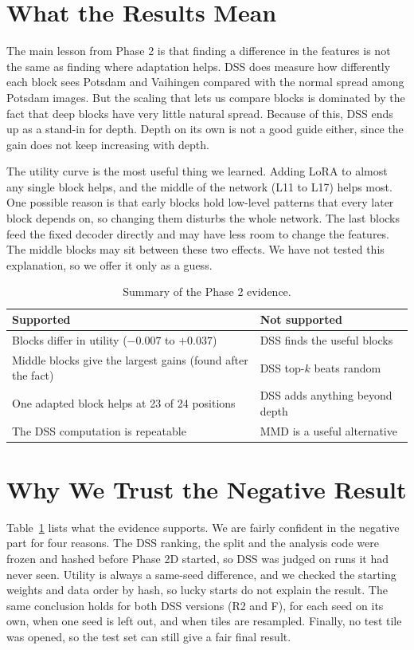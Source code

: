 \documentclass[11pt,a4paper]{report}
\begin{document}
\section{What the Results Mean}

The main lesson from Phase 2 is that finding a difference in the features is not the same as finding where adaptation helps. DSS does measure how differently each block sees Potsdam and Vaihingen compared with the normal spread among Potsdam images. But the scaling that lets us compare blocks is dominated by the fact that deep blocks have very little natural spread. Because of this, DSS ends up as a stand-in for depth. Depth on its own is not a good guide either, since the gain does not keep increasing with depth.

The utility curve is the most useful thing we learned. Adding LoRA to almost any single block helps, and the middle of the network (L11 to L17) helps most. One possible reason is that early blocks hold low-level patterns that every later block depends on, so changing them disturbs the whole network. The last blocks feed the fixed decoder directly and may have less room to change the features. The middle blocks may sit between these two effects. We have not tested this explanation, so we offer it only as a guess.

\begin{table}[t]
\centering
\caption{Summary of the Phase 2 evidence.}
\label{tab:summary}
\small
\begin{tabular}{@{}p{3.6cm}p{3.6cm}@{}}
\toprule
\textbf{Supported} & \textbf{Not supported} \\
\midrule
Blocks differ in utility ($-0.007$ to $+0.037$) & DSS finds the useful blocks \\
Middle blocks give the largest gains (found after the fact) & DSS top-$k$ beats random \\
One adapted block helps at 23 of 24 positions & DSS adds anything beyond depth \\
The DSS computation is repeatable & MMD is a useful alternative \\
\bottomrule
\end{tabular}
\end{table}

\section{Why We Trust the Negative Result}

Table~\ref{tab:summary} lists what the evidence supports. We are fairly confident in the negative part for four reasons. The DSS ranking, the split and the analysis code were frozen and hashed before Phase 2D started, so DSS was judged on runs it had never seen. Utility is always a same-seed difference, and we checked the starting weights and data order by hash, so lucky starts do not explain the result. The same conclusion holds for both DSS versions (R2 and F), for each seed on its own, when one seed is left out, and when tiles are resampled. Finally, no test tile was opened, so the test set can still give a fair final result.
\end{document}
